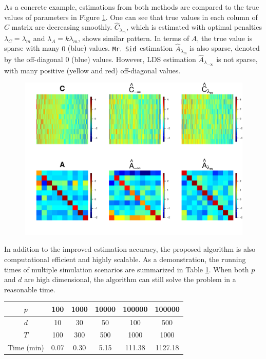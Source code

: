 \documentclass[fleqn,12pt]{article}
\let\oldref\ref
\renewcommand{\ref}[1]{(\oldref{#1})}
\newcommand{\mrsid}{{\sc \texttt{Mr}.~\texttt{Sid}}}
\begin{document}
As a concrete example, estimations from both methods are compared to the true values of parameters in Figure \oldref{fig:heatmap}. One can see that true values in each column of $C$ matrix are decreasing smoothly. $\hat{C}_{\lambda_m}$, which is estimated with optimal penalties $\lambda_C = \lambda_m$ and $\lambda_A = k\lambda_m$, shows similar pattern. In terms of $A$, the true value is sparse with many $0$ (blue) values. \mrsid~estimation $\hat{A}_{\lambda_m}$ is also sparse, denoted by the off-diagonal 0 (blue) values. However, LDS estimation $\hat{A}_{\lambda_{-\infty}}$ is not sparse, with many positive (yellow and red) off-diagonal values.
\begin{figure}
 \centering
 \includegraphics[scale=.6]{./figures/heatmap-figure-1}
 \label{fig:heatmap}
\end{figure}

In addition to the improved estimation accuracy, the proposed algorithm is also computational efficient and highly scalable. As a demonstration, the running times of multiple simulation scenarios are summarized in Table \oldref{tab:runningTime}. When both $p$ and $d$ are high dimensional, the algorithm can still solve the problem in a reasonable time.
\begin{table}
\centering
\captionof{table}{\mrsid~Running Time}
\label{tab:runningTime}
\begin{tabular}{c|ccccc}
\hline\hline
$p$ & 100 & 1000 & 10000 & 100000 & 100000\\
\hline
$d$ & 10 & 30 & 50 & 100 & 500 \\
\hline
$T$ & 100 & 300 & 500 & 1000 & 1000 \\
\hline
Time (min)& 0.07 & 0.30  & 5.15 & 111.38 & 1127.18 \\
\hline\hline
\end{tabular}
\end{table}
\end{document}
